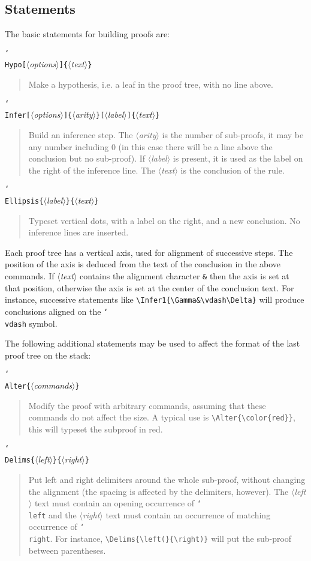 \documentclass{article}
\newcommand\lit[1]{\texttt{#1}}
\newcommand\cs[1]{\lit{\char`\\#1}}
\newcommand\meta[1]{$\langle$\textit{#1}$\rangle$}
\newcommand\oarg[1]{\lit{[}\meta{#1}\lit{]}}
\newcommand\marg[1]{\lit{\{}\meta{#1}\lit{\}}}
\newenvironment{csdoc}[1]{%
  \begin{flushleft}#1\end{flushleft}%
  \begin{quote}%
}{%
  \end{quote}%
}
\begin{document}
\subsection{Statements}
\label{sec:statements}

The basic statements for building proofs are:
\begin{csdoc}{\cs{Hypo}\oarg{options}\marg{text}}
  Make a hypothesis, i.e.
  a leaf in the proof tree, with no line above.
\end{csdoc}
\begin{csdoc}{\cs{Infer}\oarg{options}\marg{arity}\oarg{label}\marg{text}}
  Build an inference step.
  The \meta{arity} is the number of sub-proofs, it may be any number
  including 0 (in this case there will be a line above the conclusion but no
  sub-proof).
  If \meta{label} is present, it is used as the label on the right of the
  inference line.
  The \meta{text} is the conclusion of the rule.
\end{csdoc}
\begin{csdoc}{\cs{Ellipsis}\marg{label}\marg{text}}
  Typeset vertical dots, with a label on the right, and a new conclusion.
  No inference lines are inserted.
\end{csdoc}

Each proof tree has a vertical axis, used for alignment of successive steps.
The position of the axis is deduced from the text of the conclusion in the
above commands.
If \meta{text} contains the alignment character \verb|&| then the axis is
set at that position, otherwise the axis is set at the center of the
conclusion text.
For instance, successive statements like \verb|\Infer1{\Gamma&\vdash\Delta}|
will produce conclusions aligned on the \cs{vdash} symbol.

The following additional statements may be used to affect the format of the
last proof tree on the stack:

\begin{csdoc}{\cs{Alter}\marg{commands}}
  Modify the proof with arbitrary commands, assuming that these commands do
  not affect the size.
  A typical use is \verb|\Alter{\color{red}}|, this will typeset the subproof
  in red.
\end{csdoc}
\begin{csdoc}{\cs{Delims}\marg{left}\marg{right}}
  Put left and right delimiters around the whole sub-proof, without changing
  the alignment (the spacing is affected by the delimiters, however).
  The \meta{left} text must contain an opening occurrence of \cs{left} and the
  \meta{right} text must contain an occurrence of matching occurrence of
  \cs{right}.
  For instance, \verb|\Delims{\left(}{\right)}| will put the
  sub-proof between parentheses.
\end{csdoc}
\end{document}

